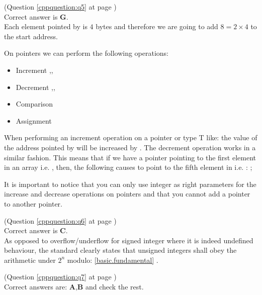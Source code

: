 \begin{cppanswer}
    \label{cppquestion:s5}
    (Question \ref{cppquestion:q5} at page \pageref{cppquestion:q5}) \hfill \\
    Correct answer is \textbf{G}. \\
    Each element pointed by  is $4$ bytes and therefore we are going to add $8=2\times 4$ to the start address.

    On pointers we can perform the following operations:
    \begin{itemize}
        \item Increment \inline{++},\inline{+},\inline{+=}
        \item Decrement \inline{--},\inline{-},\inline{-=}
        \item Comparison \inline{==}
        \item Assignment \inline{=}
    \end{itemize}

    When performing an increment operation on a pointer  or type T like:  the value of the address pointed by  will be increased by . The decrement operation works in a similar fashion.
    This means that if we have a  pointer  pointing to the first element in an array  i.e. , then, the following causes  to point to the fifth element in  i.e. :   ;

    It is important to notice that you can only use integer as right parameters for the increase and decrease operations on pointers and that you cannot add a pointer to another pointer.
\end{cppanswer}


\begin{cppanswer}
    \label{cppquestion:s6}
    (Question \ref{cppquestion:q6} at page \pageref{cppquestion:q6}) \hfill \\
    Correct answer is \textbf{C}. \\
    As opposed to overflow/underflow for signed integer where it is indeed undefined behaviour, the standard clearly states that unsigned integers shall obey the arithmetic under $2^n$ modulo:  \href{https://eel.is/c++draft/basic.fundamental#2}{[basic.fundamental]} .
   
\end{cppanswer}


\begin{cppanswer}
    \label{cppquestion:s7}
    (Question \ref{cppquestion:q7} at page \pageref{cppquestion:q7}) \hfill \\
    Correct answers are: \textbf{A},\textbf{B} and check the rest. \\       
\end{cppanswer}


